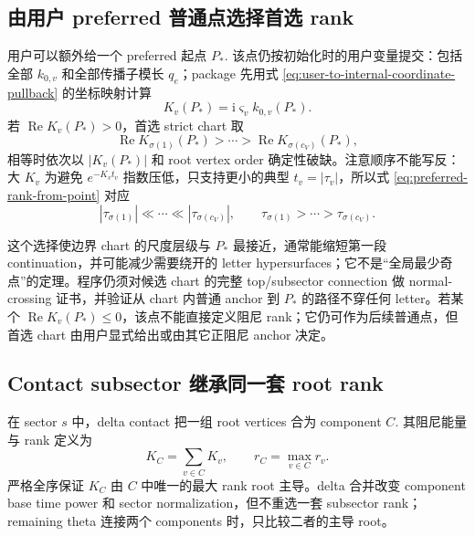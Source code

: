 \documentclass[11pt,a4paper]{ctexart}
\newcommand{\ii}{\mathrm i}
\begin{document}
\subsection{由用户 preferred 普通点选择首选 rank}

用户可以额外给一个 preferred 起点 $P_*$. 该点仍按初始化时的用户变量提交：包括全部 $k_{0,v}$ 和全部传播子模长 $q_e$；package 先用式 \eqref{eq:user-to-internal-coordinate-pullback} 的坐标映射计算
\begin{equation}
 K_v(P_*)=\ii\varsigma_vk_{0,v}(P_*).
\end{equation}
若 $\operatorname{Re}K_v(P_*)>0$，首选 strict chart 取
\begin{equation}
 \operatorname{Re}K_{\sigma(1)}(P_*)>\cdots>
 \operatorname{Re}K_{\sigma(c_V)}(P_*),
 \label{eq:preferred-rank-from-point}
\end{equation}
相等时依次以 $|K_v(P_*)|$ 和 root vertex order 确定性破缺。注意顺序不能写反：大 $K_v$ 为避免 $e^{-K_vt_v}$ 指数压低，只支持更小的典型 $t_v=|\tau_v|$，所以式 \eqref{eq:preferred-rank-from-point} 对应
\begin{equation}
 |\tau_{\sigma(1)}|\ll\cdots\ll|\tau_{\sigma(c_V)}|,
 \qquad
 \tau_{\sigma(1)}>\cdots>\tau_{\sigma(c_V)}.
\end{equation}

这个选择使边界 chart 的尺度层级与 $P_*$ 最接近，通常能缩短第一段 continuation，并可能减少需要绕开的 letter hypersurfaces；它不是“全局最少奇点”的定理。程序仍须对候选 chart 的完整 top/subsector connection 做 normal-crossing 证书，并验证从 chart 内普通 anchor 到 $P_*$ 的路径不穿任何 letter。若某个 $\operatorname{Re}K_v(P_*)\leq0$，该点不能直接定义阻尼 rank；它仍可作为后续普通点，但首选 chart 由用户显式给出或由其它正阻尼 anchor 决定。

\subsection{Contact subsector 继承同一套 root rank}

在 sector $s$ 中，delta contact 把一组 root vertices 合为 component $C$. 其阻尼能量与 rank 定义为
\begin{equation}
 K_C=\sum_{v\in C}K_v,
 \qquad
 r_C=\max_{v\in C}r_v.
 \label{eq:component-energy-rank}
\end{equation}
严格全序保证 $K_C$ 由 $C$ 中唯一的最大 rank root 主导。delta 合并改变 component base time power 和 sector normalization，但不重选一套 subsector rank；remaining theta 连接两个 components 时，只比较二者的主导 root。
\end{document}
